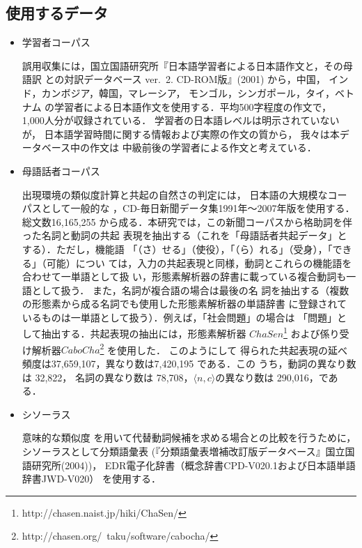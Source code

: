\documentclass[japanese]{jnlp_1.4}
\begin{document}
\subsection{使用するデータ}
\label{使用するデータ}

\begin{itemize}
\item[(1)] 学習者コーパス

誤用収集には，国立国語研究所『日本語学習者による日本語作文と，その母語訳
	   との対訳データベース ver.~2. CD-ROM版』(2001) から，中国，
	   インド，カンボジア，韓国，マレーシア，
	   モンゴル，シンガポール，タイ，ベトナム
	   の学習者による日本語作文を使用する．平均500字程度の作文で，
	   1,000人分が収録されている．
	   学習者の日本語レベルは明示されていないが，
	   日本語学習時間に関する情報および実際の作文の質から，
	   我々は本データベース中の作文は
	   中級前後の学習者による作文と考えている．

\item[(2)] 母語話者コーパス

出現環境の類似度計算と共起の自然さの判定には，
日本語の大規模なコーパスとして一般的な
，CD-毎日新聞データ集1991年〜2007年版を使用する．総文数16,165,255 
から成る．本研究では，この新聞コーパスから格助詞を伴った名詞と動詞の共起
表現を抽出する（これを「母語話者共起データ」とする）．ただし，機能語
「（さ）せる」（使役），「（ら）れる」（受身），「できる」（可能）につい
ては，入力の共起表現と同様，動詞とこれらの機能語を合わせて一単語として扱
い，形態素解析器の辞書に載っている複合動詞も一語として扱う．
また，名詞が複合語の場合は最後の名
詞を抽出する（複数の形態素から成る名詞でも使用した形態素解析器の単語辞書
に登録されているものは一単語として扱う）．例えば，「社会問題」の場合は
「問題」として抽出する．共起表現の抽出には，形態素解析器
$ChaSen$\footnote{
http://chasen.naist.jp/hiki/ChaSen/
}
および係り受け解析器$CaboCha$\footnote{
http://chasen.org/~taku/software/cabocha/
}
を使用した．
このようにして
得られた共起表現の延べ頻度は37,659,107，異なり数は7,420,195 である．この
うち，動詞の異なり数は 32,822，
名詞の異なり数は 78,708，$\langle n, c\rangle$の異なり数は 290,016，である．


\item[(3)] シソーラス

意味的な類似度
を用いて代替動詞候補を求める場合との比較を行うために，
シソーラスとして分類語彙表
(『分類語彙表増補改訂版データベース』国立国語研究所(2004))，
	   EDR電子化辞書（概念辞書CPD-V020.1および日本語単語辞書JWD-V020）
を使用する．


\end{itemize}
\end{document}
